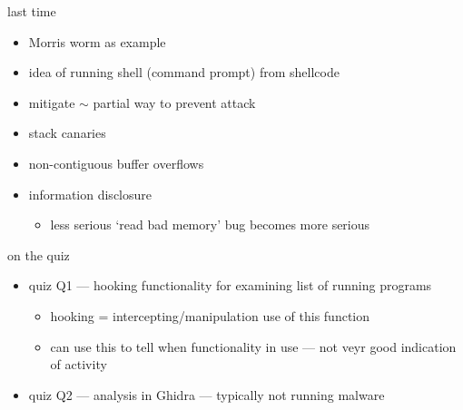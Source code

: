\date{}
\title{}
\date{}

\begin{frame}
    \titlepage
\end{frame}





\begin{frame}{last time}
    \begin{itemize}
    \item Morris worm as example
    \item idea of running shell (command prompt) from shellcode
    \vspace{.5cm}
    \item mitigate $\sim$ partial way to prevent attack
    \item stack canaries
    \item non-contiguous buffer overflows
    \item information disclosure
        \begin{itemize}
        \item less serious `read bad memory' bug becomes more serious
        \end{itemize}
    \end{itemize}
\end{frame}

\begin{frame}{on the quiz}
    \begin{itemize}
    \item quiz Q1 --- hooking functionality for examining list of running programs
        \begin{itemize}
        \item hooking = intercepting/manipulation use of this function
        \item can use this to tell when functionality in use --- not veyr good indication of activity
        \end{itemize}
    \item quiz Q2 --- analysis in Ghidra --- typically not running malware

    \end{itemize}
\end{frame}

